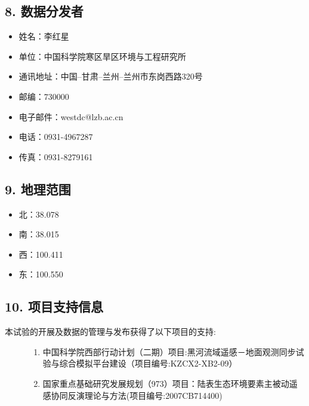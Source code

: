 \documentclass[letterpaper,10pt,english]{sphinxmanual}
\begin{document}
\subsection{8.      数据分发者}
\label{fecd46b0-3390-4580-a415-2d49ba77f9bd:id8}\begin{itemize}
\item {} 
姓名：李红星

\item {} 
单位：中国科学院寒区旱区环境与工程研究所

\item {} 
通讯地址：中国--甘肃--兰州--兰州市东岗西路320号

\item {} 
邮编：730000

\item {} 
电子邮件：westdc@lzb.ac.cn

\item {} 
电话：0931-4967287

\item {} 
传真：0931-8279161

\end{itemize}


\subsection{9.      地理范围}
\label{fecd46b0-3390-4580-a415-2d49ba77f9bd:id9}\begin{itemize}
\item {} 
北：38.078

\item {} 
南：38.015

\item {} 
西：100.411

\item {} 
东：100.550

\end{itemize}


\subsection{10.     项目支持信息}
\label{fecd46b0-3390-4580-a415-2d49ba77f9bd:id10}\begin{description}
\item[{本试验的开展及数据的管理与发布获得了以下项目的支持:}] \leavevmode\begin{enumerate}
\item {} 
中国科学院西部行动计划（二期）项目:黑河流域遥感－地面观测同步试验与综合模拟平台建设（项目编号:KZCX2-XB2-09）

\item {} 
国家重点基础研究发展规划（973）项目：陆表生态环境要素主被动遥感协同反演理论与方法(项目编号:2007CB714400)

\end{enumerate}

\end{description}
\end{document}
